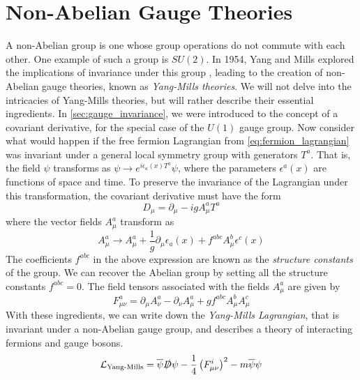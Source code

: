 \section{Non-Abelian Gauge Theories}\label{sec:non_abelian}
A non-Abelian group is one whose group operations do not commute with each other. One example of such a group is $SU(2)$. In 1954, Yang and Mills explored the implications of invariance under this group \citep{Yang1954}, leading to the creation of non-Abelian gauge theories, known as \emph{Yang-Mills theories}. 
We will not delve into the intricacies of Yang-Mills theories, but will rather describe their essential ingredients. In \autoref{sec:gauge_invariance}, we were introduced to the concept of a covariant derivative, for the special case of the $U(1)$ gauge group. Now consider what would happen if the free fermion Lagrangian from \autoref{eq:fermion_lagrangian} was invariant under a general local symmetry group with generators $T^a$. That is, the field $\psi$ transforms as $\psi\rightarrow e^{i\epsilon_a(x) T^a}\psi$, where the parameters $\epsilon^a(x)$ are functions of space and time. To preserve the invariance of the Lagrangian under this transformation, the covariant derivative must have the form 
$$D_\mu = \partial_\mu - igA_\mu^aT^a$$
where the vector fields $A_\mu^a$ transform as 
$$A_\mu^a\rightarrow A_\mu^a + \frac{1}{g}\partial_\mu\epsilon_a(x) + f^{abc}A_\mu^b\epsilon^c(x)$$ 
The coefficients $f^{abc}$ in the above expression are known as the \emph{structure constants} of the group. We can recover the Abelian group by setting all the structure constants $f^{abc} = 0$. The field tensors associated with the fields $A_\mu^a$ are given by
$$F_{\mu\nu}^a = \partial_\mu A_\nu^a - \partial_\nu A_\mu^a + gf^{abc}A_\mu^b A_\mu^c$$
With these ingredients, we can write down the \emph{Yang-Mills Lagrangian}, that is invariant under a non-Abelian gauge group, and describes a theory of interacting fermions and gauge bosons.
$$\mathcal{L}_\text{Yang-Mills} = \bar{\psi}\slashed{D}\psi - \frac{1}{4}\left(F_{\mu\nu}^i\right)^2 - m\bar{\psi}\psi$$

